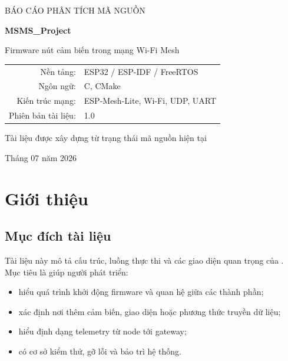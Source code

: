 \documentclass[a4paper]{article}
\newcommand{\codeword}[1]{\texttt{\detokenize{#1}}}
\begin{document}

\begin{titlepage}
  \centering
  \vspace*{1.2cm}
  {\large BÁO CÁO PHÂN TÍCH MÃ NGUỒN\par}
  \vspace{1.5cm}
  {\Huge\bfseries MSMS\_Project\par}
  \vspace{0.8cm}
  {\Large Firmware nút cảm biến trong mạng Wi-Fi Mesh\par}
  \vspace{2cm}

  \begin{tabular}{rl}
    Nền tảng: & ESP32 / ESP-IDF / FreeRTOS \\
    Ngôn ngữ: & C, CMake \\
    Kiến trúc mạng: & ESP-Mesh-Lite, Wi-Fi, UDP, UART \\
    Phiên bản tài liệu: & 1.0 \\
  \end{tabular}

  \vfill
  {\large Tài liệu được xây dựng từ trạng thái mã nguồn hiện tại\par}
  \vspace{0.3cm}
  {\large Tháng 07 năm 2026\par}
\end{titlepage}

\tableofcontents
\clearpage
\listoftables
\clearpage
{}

\section{Giới thiệu}

\subsection{Mục đích tài liệu}

Tài liệu này mô tả cấu trúc, luồng thực thi và các giao diện quan trọng của
\codeword{MSMS_Project}. Mục tiêu là giúp người phát triển:

\begin{itemize}
  \item hiểu quá trình khởi động firmware và quan hệ giữa các thành phần;
  \item xác định nơi thêm cảm biến, giao diện hoặc phương thức truyền dữ liệu;
  \item hiểu định dạng telemetry từ node tới gateway;
  \item có cơ sở kiểm thử, gỡ lỗi và bảo trì hệ thống.
\end{itemize}
\end{document}
